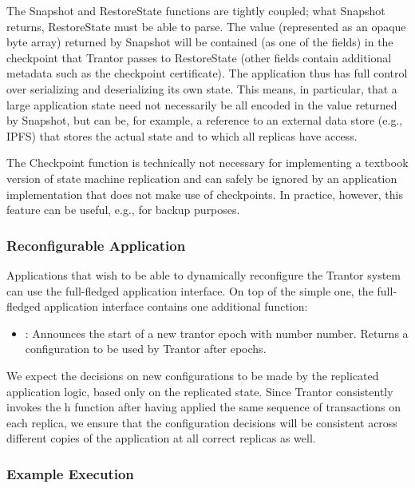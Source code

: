 \documentclass{article}
\begin{document}
The Snapshot and RestoreState functions are tightly coupled; what Snapshot returns, RestoreState must be able to parse.
The  value (represented as an opaque byte array) returned by Snapshot
will be contained (as one of the fields) in the checkpoint that Trantor passes to RestoreState
(other fields contain additional metadata such as the checkpoint certificate).
The application thus has full control over serializing and deserializing its own state.
This means, in particular, that a large application state need not necessarily be all encoded in the value returned by Snapshot,
but can be, for example, a reference to an external data store (e.g., IPFS) that stores the actual state and to which all replicas have access.

The Checkpoint function is technically not necessary for implementing a textbook version of state machine replication
and can safely be ignored by an application implementation that does not make use of checkpoints.
In practice, however, this feature can be useful, e.g., for backup purposes.

\subsubsection{Reconfigurable Application}

Applications that wish to be able to dynamically reconfigure the Trantor system can use the full-fledged application interface.
On top of the simple one, the full-fledged application interface contains one additional function:
\begin{itemize}
    \item {}: Announces the start of a new trantor epoch with number number.
    Returns a configuration to be used by Trantor after  epochs.
\end{itemize}

We expect the decisions on new configurations to be made by the replicated application logic, based only on the replicated state.
Since Trantor consistently invokes the h function after having applied the same sequence of transactions on each replica,
we ensure that the configuration decisions will be consistent across different copies of the application at all correct replicas as well.

\subsubsection{Example Execution}
\end{document}
